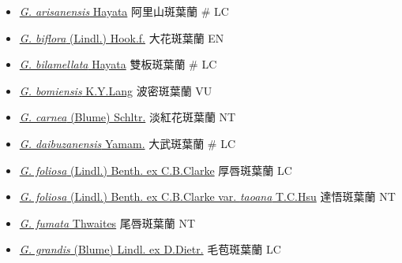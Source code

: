 \begin{itemize}
  \begin{itemize}
        \item[] \href{http://www.theplantlist.org/tpl1.1/search?q=Goodyera+arisanensis}{\textit{G. arisanensis} Hayata}   阿里山斑葉蘭  \# LC
        \item[] \href{http://www.theplantlist.org/tpl1.1/search?q=Goodyera+biflora}{\textit{G. biflora} (Lindl.) Hook.f.}   大花斑葉蘭   EN
        \item[] \href{http://www.theplantlist.org/tpl1.1/search?q=Goodyera+bilamellata}{\textit{G. bilamellata} Hayata}   雙板斑葉蘭  \# LC
        \item[] \href{http://www.theplantlist.org/tpl1.1/search?q=Goodyera+bomiensis}{\textit{G. bomiensis} K.Y.Lang}   波密斑葉蘭   VU
        \item[] \href{http://www.theplantlist.org/tpl1.1/search?q=Goodyera+carnea}{\textit{G. carnea} (Blume) Schltr.}   淡紅花斑葉蘭   NT
        \item[] \href{http://www.theplantlist.org/tpl1.1/search?q=Goodyera+daibuzanensis}{\textit{G. daibuzanensis} Yamam.}   大武斑葉蘭  \# LC
        \item[] \href{http://www.theplantlist.org/tpl1.1/search?q=Goodyera+foliosa}{\textit{G. foliosa} (Lindl.) Benth. ex C.B.Clarke}   厚唇斑葉蘭   LC
        \item[] \href{http://www.theplantlist.org/tpl1.1/search?q=Goodyera+foliosa+var.+taoana}{\textit{G. foliosa} (Lindl.) Benth. ex C.B.Clarke var. \textit{taoana} T.C.Hsu}   達悟斑葉蘭   NT
        \item[] \href{http://www.theplantlist.org/tpl1.1/search?q=Goodyera+fumata}{\textit{G. fumata} Thwaites}   尾唇斑葉蘭   NT
        \item[] \href{http://www.theplantlist.org/tpl1.1/search?q=Goodyera+grandis}{\textit{G. grandis} (Blume) Lindl. ex D.Dietr.}   毛苞斑葉蘭   LC

\end{itemize}
\end{itemize}
